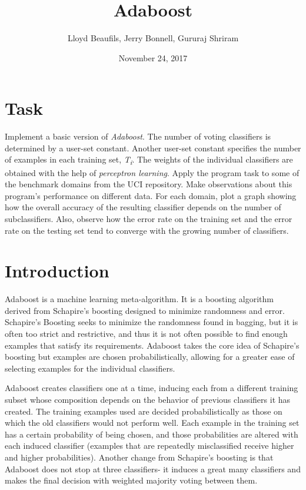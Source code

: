 \documentclass{article}
\title{Adaboost}
\author{Lloyd Beaufils, Jerry Bonnell, Gururaj Shriram}
\date{November 24, 2017}
\begin{document}
\maketitle

\section{Task}

Implement a basic version of \textit{Adaboost}. The number of voting classifiers is determined by a user-set constant. Another user-set constant specifies the number of examples in each training set, \textit{T\textsubscript{i}}. The weights of the individual classifiers are obtained with the help of \textit{perceptron learning}. Apply the program task to some of the benchmark domains from the UCI repository. Make observations about this program's performance on different data. For each domain, plot a graph showing how the overall accuracy of the resulting classifier depends on the number of subclassifiers. Also, observe how the error rate on the training set and the error rate on the testing set tend to converge with the growing number of classifiers.

\section{Introduction}

Adaboost is a machine learning meta-algorithm. It is a boosting algorithm derived from Schapire’s boosting designed to minimize randomness and error. Schapire’s Boosting seeks to minimize the randomness found in bagging, but it is often too strict and restrictive, and thus it is not often possible to find enough examples that satisfy its requirements. Adaboost takes the core idea of Schapire’s boosting but examples are chosen probabilistically, allowing for a greater ease of selecting examples for the individual classifiers.

Adaboost creates classifiers one at a time, inducing each from a different training subset whose composition depends on the behavior of previous classifiers it has created. The training examples used are decided probabilistically as those on which the old classifiers would not perform well. Each example in the training set has a certain probability of being chosen, and those probabilities are altered with each induced classifier (examples that are repeatedly misclassified receive higher and higher probabilities). Another change from Schapire’s boosting is that Adaboost does not stop at three classifiers- it induces a great many classifiers and makes the final decision with weighted majority voting between them.
\end{document}
